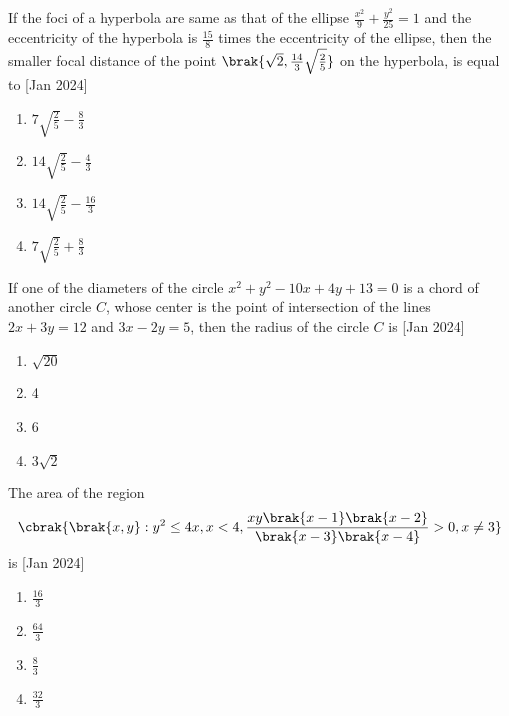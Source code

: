 \item If the foci of a hyperbola are same as that of the ellipse
    $\frac{x^2}{9} + \frac{y^2}{25} = 1$ and the eccentricity of the
    hyperbola is $\frac{15}{8}$ times the eccentricity of the
    ellipse, then the smaller focal distance of the point
    $\brak{\sqrt{2}, \frac{14}{3} \sqrt{\frac{2}{5}}}$ on the hyperbola,
    is equal to
    \hfill{[Jan 2024]}

    \begin{multicols}{4}
        \begin{enumerate}

            \item $7\sqrt{\frac{2}{5}} - \frac{8}{3}$
            \item $14\sqrt{\frac{2}{5}} - \frac{4}{3}$
            \item $14\sqrt{\frac{2}{5}} - \frac{16}{3}$
            \item $7\sqrt{\frac{2}{5}} + \frac{8}{3}$
        \end{enumerate}
    \end{multicols}

\item If one of the diameters of the circle $x^2 + y^2 - 10x +
    4y + 13 = 0$ is a chord of another circle $C$, whose
    center is the point of intersection of the lines $2x +
    3y = 12$ and $3x - 2y = 5$, then the radius of the
    circle $C$ is
    \hfill{[Jan 2024]}

    \begin{multicols}{4}
        \begin{enumerate}

            \item $\sqrt{20}$
            \item 4
            \item 6
            \item $3\sqrt{2}$
        \end{enumerate}
    \end{multicols}

\item The area of the region
    \begin{align*}
        \cbrak{\brak{x,y}: y^2\le 4x,x<4,\frac{xy\brak{x-1}\brak{x-2}}{\brak{x-3}\brak{x-4}}>0,x\ne3}
    \end{align*}
    is
    \hfill{[Jan 2024]}

    \begin{multicols}{4}
        \begin{enumerate}

            \item $\frac{16}{3}$
            \item $\frac{64}{3}$
            \item $\frac{8}{3}$
            \item $\frac{32}{3}$
        \end{enumerate}
    \end{multicols}


